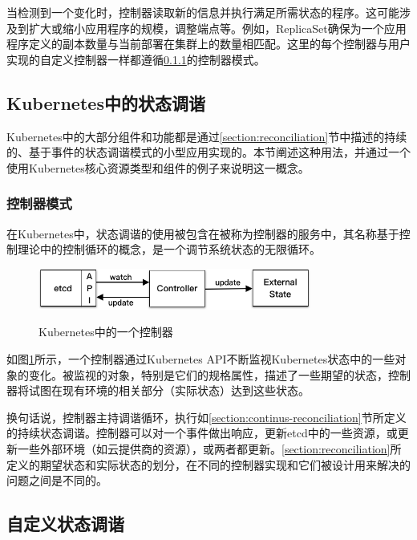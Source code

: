 \documentclass[macfonts,master]{njuthesis}
\begin{document}
当检测到一个变化时，控制器读取新的信息并执行满足所需状态的程序。这可能涉及到扩大或缩小应用程序的规模，调整端点等。例如，ReplicaSet确保为一个应用程序定义的副本数量与当前部署在集群上的数量相匹配。这里的每个控制器与用户实现的自定义控制器一样都遵循\ref{section:controller-pattern}的控制器模式。

\subsection{Kubernetes中的状态调谐}

Kubernetes中的大部分组件和功能都是通过\ref{section:reconciliation}节中描述的持续的、基于事件的状态调谐模式的小型应用实现的。本节阐述这种用法，并通过一个使用Kubernetes核心资源类型和组件的例子来说明这一概念。

\subsubsection{控制器模式}\label{section:controller-pattern}

在Kubernetes中，状态调谐的使用被包含在被称为控制器的服务中，其名称基于控制理论中的控制循环的概念，是一个调节系统状态的无限循环\cite{k8scontroller}。

\begin{figure}[htbp]
  \centering
  \includegraphics[width= 0.8\textwidth]{pics/controller-pattern.png}\\
  \caption{Kubernetes中的一个控制器}\label{fig:k8s-controller-pattern}
\end{figure}

如图\ref{fig:k8s-controller-pattern}所示，一个控制器通过Kubernetes API不断监视Kubernetes状态中的一些对象的变化。被监视的对象，特别是它们的规格属性，描述了一些期望的状态，控制器将试图在现有环境的相关部分（实际状态）达到这些状态。

换句话说，控制器主持调谐循环，执行如\ref{section:continus-reconciliation}节所定义的持续状态调谐。控制器可以对一个事件做出响应，更新etcd中的一些资源，或更新一些外部环境（如云提供商的资源），或两者都更新。\ref{section:reconciliation}所定义的期望状态和实际状态的划分，在不同的控制器实现和它们被设计用来解决的问题之间是不同的。

\subsection{自定义状态调谐}\label{section:custom-reconciliation}
\end{document}
